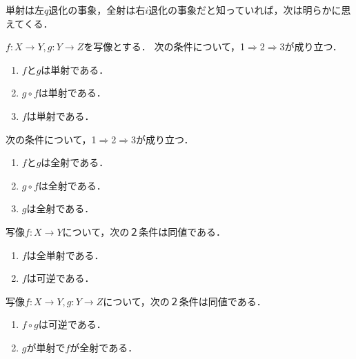 \documentclass[uplatex,dvipdfmx]{jsreport}
\begin{document}
単射は左$q$退化の事象，全射は右$i$退化の事象だと知っていれば，次は明らかに思えてくる．
\begin{lemma}
    $f:X\to Y, g:Y\to Z$を写像とする．
    次の条件について，1$\Rightarrow$2$\Rightarrow$3が成り立つ．
    \begin{enumerate}
        \item $f$と$g$は単射である．
        \item $g\circ f$は単射である．
        \item $f$は単射である．
    \end{enumerate}
    次の条件について，1$\Rightarrow$2$\Rightarrow$3が成り立つ．
    \begin{enumerate}
        \item $f$と$g$は全射である．
        \item $g\circ f$は全射である．
        \item $g$は全射である．
    \end{enumerate}
\end{lemma}

\begin{proposition}
    写像$f:X\to Y$について，次の２条件は同値である．
    \begin{enumerate}
        \item $f$は全単射である．
        \item $f$は可逆である．
    \end{enumerate}
\end{proposition}

\begin{proposition}
    写像$f:X\to Y,g:Y\to Z$について，次の２条件は同値である．
    \begin{enumerate}
        \item $f\circ g$は可逆である．
        \item $g$が単射で$f$が全射である．
    \end{enumerate}
\end{proposition}
\end{document}
